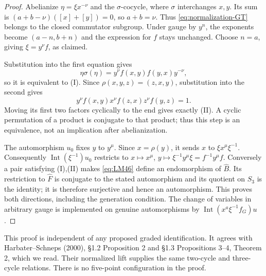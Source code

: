 \begin{proof}
Abelianize $\eta=\xi x^{-\nu}$ and the $\sigma$-cocycle, where $\sigma$ interchanges $x,y$. Its sum is $(a+b-\nu)([x]+[y])=0$, so $a+b=\nu$. Thus \eqref{eq:normalization-GT} belongs to the closed commutator subgroup. Under gauge by $y^n$, the exponents become $(a-n,b+n)$ and the expression for $f$ stays unchanged. Choose $n=a$, giving $\xi=y^\nu f$, as claimed.

Substitution into the first equation gives
\[
 \eta\sigma(\eta)=y^\nu f(x,y)f(y,x)y^{-\nu},
\]
so it is equivalent to (I). Since $\rho(x,y,z)=(z,x,y)$, substitution into the second gives
\[
 y^\nu f(x,y)x^\nu f(z,x)z^\nu f(y,z)=1.
\]
Moving its first two factors cyclically to the end gives exactly (II). A cyclic permutation of a product is conjugate to that product; thus this step is an equivalence, not an implication after abelianization.

The automorphism $u_0$ fixes $y$ to $y^\mu$. Since $x=\rho(y)$, it sends $x$ to $\xi x^\mu\xi^{-1}$. Consequently $\operatorname{Int}(\xi^{-1})u_0$ restricts to
$x\mapsto x^\mu$, $y\mapsto\xi^{-1}y^\mu\xi=f^{-1}y^\mu f$.
Conversely a pair satisfying (I),(II) makes \eqref{eq:LM46} define an endomorphism of $\widehat B$. Its restriction to $\widehat F$ is conjugate to the stated automorphism and its quotient on $S_3$ is the identity; it is therefore surjective and hence an automorphism. This proves both directions, including the generation condition. The change of variables in arbitrary gauge is implemented on genuine automorphisms by $\operatorname{Int}(x^a\xi^{-1}f_G)u$.
\end{proof}

This proof is independent of any proposed graded identification. It agrees with Harbater--Schneps (2000), \S1.2 Proposition 2 and \S1.3 Propositions 3--4, Theorem 2, which we read. Their normalized lift supplies the same two-cycle and three-cycle relations. There is no five-point configuration in the proof.

